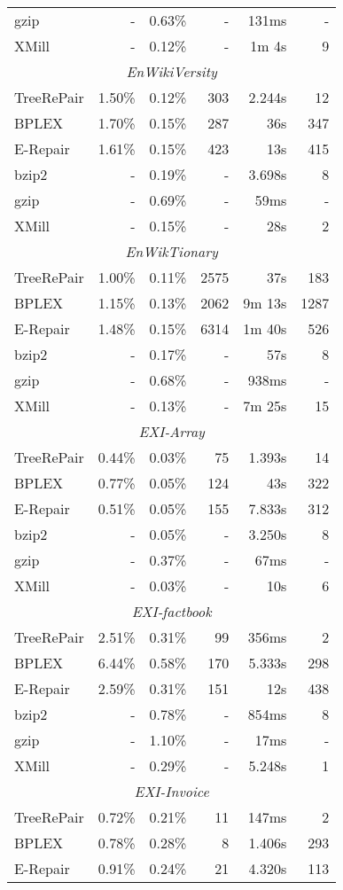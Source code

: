 \documentclass[12pt]{llncs}
\begin{document}
\begin{longtable}{lrrrrr}
			gzip&-&0.63\%&-&131ms&-\\*
			XMill&-&0.12\%&-&1m 4s&9\\
			\midrule\multicolumn{6}{c}{\emph{EnWikiVersity}}\\*
			TreeRePair&1.50\%&0.12\%&303&2.244s&12\\*
			BPLEX&1.70\%&0.15\%&287&36s&347\\*
			E-Repair&1.61\%&0.15\%&423&13s&415\\*
			bzip2&-&0.19\%&-&3.698s&8\\*
			gzip&-&0.69\%&-&59ms&-\\*
			XMill&-&0.15\%&-&28s&2\\
			\midrule\multicolumn{6}{c}{\emph{EnWikTionary}}\\*
			TreeRePair&1.00\%&0.11\%&2575&37s&183\\*
			BPLEX&1.15\%&0.13\%&2062&9m 13s&1287\\*
			E-Repair&1.48\%&0.15\%&6314&1m 40s&526\\*
			bzip2&-&0.17\%&-&57s&8\\*
			gzip&-&0.68\%&-&938ms&-\\*
			XMill&-&0.13\%&-&7m 25s&15\\
			\midrule\multicolumn{6}{c}{\emph{EXI-Array}}\\*
			TreeRePair&0.44\%&0.03\%&75&1.393s&14\\*
			BPLEX&0.77\%&0.05\%&124&43s&322\\*
			E-Repair&0.51\%&0.05\%&155&7.833s&312\\*
			bzip2&-&0.05\%&-&3.250s&8\\*
			gzip&-&0.37\%&-&67ms&-\\*
			XMill&-&0.03\%&-&10s&6\\
			\midrule\multicolumn{6}{c}{\emph{EXI-factbook}}\\*
			TreeRePair&2.51\%&0.31\%&99&356ms&2\\*
			BPLEX&6.44\%&0.58\%&170&5.333s&298\\*
			E-Repair&2.59\%&0.31\%&151&12s&438\\*
			bzip2&-&0.78\%&-&854ms&8\\*
			gzip&-&1.10\%&-&17ms&-\\*
			XMill&-&0.29\%&-&5.248s&1\\
			\midrule\multicolumn{6}{c}{\emph{EXI-Invoice}}\\*
			TreeRePair&0.72\%&0.21\%&11&147ms&2\\*
			BPLEX&0.78\%&0.28\%&8&1.406s&293\\*
			E-Repair&0.91\%&0.24\%&21&4.320s&113\\*

\end{longtable}
\end{document}
